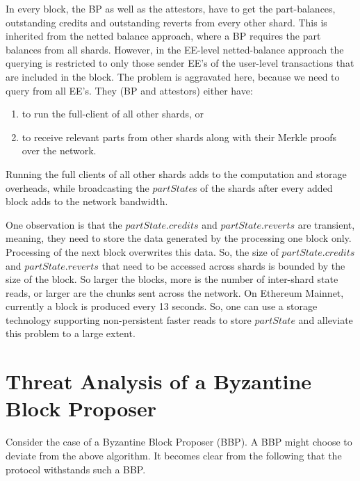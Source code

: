 \documentclass{IEEEtran}
\begin{document}
In every block, the BP as well as the attestors, have to get the part-balances, outstanding credits and outstanding reverts from every other shard. This is inherited from the netted balance approach, where a BP requires the part balances from all shards. However, in the EE-level netted-balance approach the querying is restricted to only those sender EE's of the user-level transactions that are included in the block. The problem is aggravated here, because we need to query from all EE's. They (BP and attestors) either have:
\begin{enumerate}
	\item to run the full-client of all other shards, or
	\item to receive relevant parts from other shards along with their Merkle proofs over the network. 
\end{enumerate}	
Running the full clients of all other shards adds to the computation and storage overheads, while broadcasting the $partState$s of the shards after every added block adds to the network bandwidth. 

One observation is that the $partState.credits$ and $partState.reverts$ are transient, meaning, they need to store the data generated by the processing one block only. Processing of the next block overwrites this data. So, the size of $partState.credits$ and $partState.reverts$ that need to be accessed across shards is bounded by the size of the block. So larger the blocks, more is the number of inter-shard state reads, or larger are the chunks sent across the network. On Ethereum Mainnet, currently a block is produced every 13 seconds. So, one can use a storage technology supporting non-persistent faster reads to store $partState$ and alleviate this problem to a large extent.

\section{Threat Analysis of a Byzantine Block Proposer}
\label{sec:threat}
Consider the case of a Byzantine Block Proposer (BBP). A BBP might choose to deviate from the above algorithm. It becomes clear from the following that the protocol withstands such a BBP.
\end{document}
